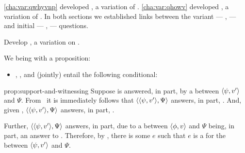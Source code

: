 \begin{note}
  \autoref{cha:var:qwhyvnp} developed \qWhyV{}, a variation of \qWhy{}.
  \autoref{cha:var:qhowv} developed \qHowV{}, a variation of \qHow{}.
  In both sections we established links between the variant --- \qWhyV{}, \qHowV{}  --- and initial --- \qWhy{}, \qHow{} --- questions.

  Develop \issueConstraint{}, a variation on \issueInclusion{}.
\end{note}

\begin{note}
 We being with a proposition:

  \begin{proposition}[\qWhyV{}-\qWhy{}-\qHow{}-\qHowV{}]
    \label{prop:support-and-witnessing}

    \begin{itemize}[leftmargin=*]
    \item
      \linkW{}, \linkH{}, and \issueInclusion{} (jointly) entail the following conditional:
    \end{itemize}
    \vspace{-\baselineskip}
  \end{proposition}

  \begin{argument}{prop:support-and-witnessing}
    Suppose \qWhyV{} is answered, in part, by a \ros{} between \(\langle \psi, v' \rangle\) and \(\Psi\).
    From~\linkW{} it is immediately follows that \(\langle \langle \psi, v' \rangle, \Psi \rangle\) answers, in part, \qWhy{}.
    And, given \issueInclusion{}, \(\langle \langle \psi, v' \rangle, \Psi \rangle\) answers, in part, \qHow{}.

    Further, \(\langle \langle \psi, v' \rangle, \Psi \rangle\) answers, in part, \qHow{} due to a \ros{} between \(\langle \phi, v \rangle\) and \(\Psi\) being, in part, an answer to \qWhyV{}.
    Therefore, by \linkH{}, there is some \(e\) such that \(e\) is a  for the \ros{} between \(\langle \psi, v' \rangle\) and \(\Psi\).
  \end{argument}
\end{note}


